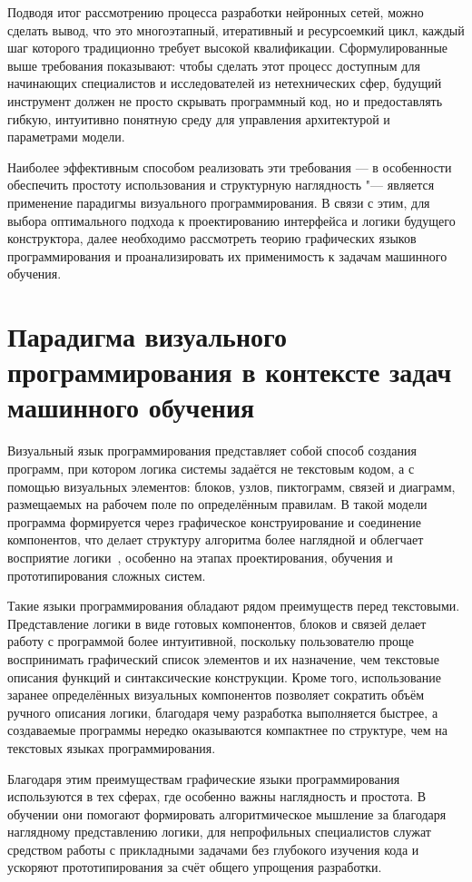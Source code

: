 \documentclass{report}
\begin{document}
Подводя итог рассмотрению процесса разработки нейронных сетей, можно сделать вывод, что это многоэтапный, итеративный и ресурсоемкий цикл, каждый шаг которого традиционно требует высокой квалификации. Сформулированные выше требования показывают: чтобы сделать этот процесс доступным для начинающих специалистов и исследователей из нетехнических сфер, будущий инструмент должен не просто скрывать программный код, но и предоставлять гибкую, интуитивно понятную среду для управления архитектурой и параметрами модели.

Наиболее эффективным способом реализовать эти требования — в особенности обеспечить простоту использования и структурную наглядность "--- является применение парадигмы визуального программирования. В связи с этим, для выбора оптимального подхода к проектированию интерфейса и логики будущего конструктора, далее необходимо рассмотреть теорию графических языков программирования и проанализировать их применимость к задачам машинного обучения.


\section{Парадигма визуального программирования в контексте задач машинного обучения}

Визуальный язык программирования представляет собой способ создания программ, при котором логика системы задаётся не текстовым кодом, а с помощью визуальных элементов: блоков, узлов, пиктограмм, связей и диаграмм, размещаемых на рабочем поле по определённым правилам. В такой модели программа формируется через графическое конструирование и соединение компонентов, что делает структуру алгоритма более наглядной и облегчает восприятие логики~\cite{bib_vpl_theory}, особенно на этапах проектирования, обучения и прототипирования сложных систем.

Такие языки программирования обладают рядом преимуществ перед текстовыми. Представление логики в виде готовых компонентов, блоков и связей делает работу с программой более интуитивной, поскольку пользователю проще воспринимать графический список элементов и их назначение, чем текстовые описания функций и синтаксические конструкции. Кроме того, использование заранее определённых визуальных компонентов позволяет сократить объём ручного описания логики, благодаря чему разработка выполняется быстрее, а создаваемые программы нередко оказываются компактнее по структуре, чем на текстовых языках программирования.

Благодаря этим преимуществам графические языки программирования используются в тех сферах, где особенно важны наглядность и простота. В обучении они помогают формировать алгоритмическое мышление за благодаря наглядному представлению логики, для непрофильных специалистов служат средством работы с прикладными задачами без глубокого изучения кода и ускоряют прототипирования за счёт общего упрощения разработки.
\end{document}
